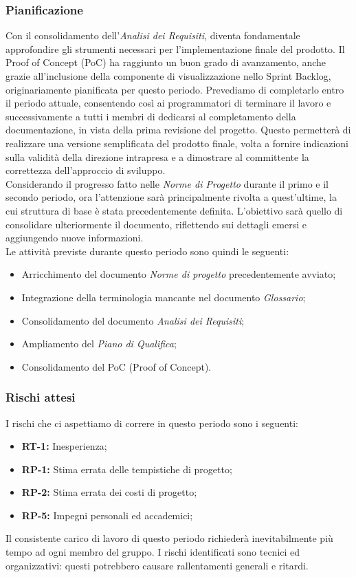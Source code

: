 \subsubsection{Pianificazione}
Con il consolidamento dell'\textit{Analisi dei Requisiti}, diventa fondamentale approfondire gli
strumenti necessari per l'implementazione finale del prodotto. Il Proof of Concept (PoC) ha
raggiunto un buon grado di avanzamento, anche grazie all'inclusione della componente di
visualizzazione nello Sprint Backlog, originariamente pianificata per questo periodo.
Prevediamo di completarlo entro il periodo attuale, consentendo così ai programmatori di terminare
il lavoro e successivamente a tutti i membri di dedicarsi al completamento della documentazione, in
vista della prima revisione del progetto. Questo permetterà di realizzare una versione semplificata
del prodotto finale, volta a fornire indicazioni sulla validità della direzione intrapresa e a
dimostrare al committente la correttezza dell'approccio di sviluppo.\\
Considerando il progresso fatto nelle \textit{Norme di Progetto} durante il primo e il secondo
periodo, ora l'attenzione sarà principalmente rivolta a quest'ultime, la cui struttura di base è
stata precedentemente definita. L'obiettivo sarà quello di consolidare ulteriormente il documento,
riflettendo sui dettagli emersi e aggiungendo nuove informazioni.\\
Le attivit\`{a} previste durante questo periodo sono quindi le seguenti:
\begin{itemize}
\setlength{\itemsep}{0em}
    \item Arricchimento del documento \textit{Norme di progetto} precedentemente avviato;
    \item Integrazione della terminologia mancante nel documento \textit{Glossario};
    \item Consolidamento del documento \textit{Analisi dei Requisiti};
    \item Ampliamento del \textit{Piano di Qualifica};
    \item Consolidamento del PoC (Proof of Concept).
\end{itemize}
\subsubsection{Rischi attesi}
I rischi che ci aspettiamo di correre in questo periodo sono i seguenti: 
\begin{itemize}
\setlength{\itemsep}{0em}
\item \textbf{RT-1:} Inesperienza;
\item \textbf{RP-1:} Stima errata delle tempistiche di progetto;
\item \textbf{RP-2:} Stima errata dei costi di progetto;
\item \textbf{RP-5:} Impegni personali ed accademici;
\end{itemize}
Il consistente carico di lavoro di questo periodo richiederà inevitabilmente più tempo ad ogni membro del gruppo. I rischi identificati sono tecnici ed organizzativi: questi potrebbero causare rallentamenti generali e ritardi.
\clearpage
